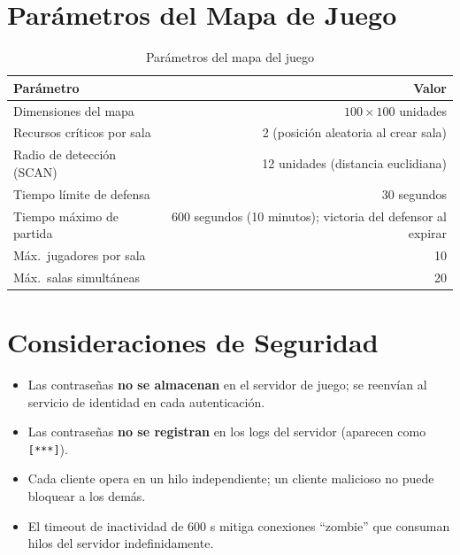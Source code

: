 \documentclass[12pt, letterpaper]{article}
\begin{document}
\section{Parámetros del Mapa de Juego}

\begin{table}[H]
\centering
\begin{tabular}{l r}
\toprule
\textbf{Parámetro} & \textbf{Valor} \\
\midrule
Dimensiones del mapa             & $100 \times 100$ unidades \\
Recursos críticos por sala       & 2 (posición aleatoria al crear sala) \\
Radio de detección (\textsc{SCAN}) & 12 unidades (distancia euclidiana) \\
Tiempo límite de defensa         & 30 segundos \\
Tiempo máximo de partida         & 600 segundos (10 minutos); victoria del defensor al expirar \\
Máx.\ jugadores por sala         & 10 \\
Máx.\ salas simultáneas          & 20 \\
\bottomrule
\end{tabular}
\caption{Parámetros del mapa del juego}
\end{table}

\section{Consideraciones de Seguridad}

\begin{itemize}[leftmargin=2em]
    \item Las contraseñas \textbf{no se almacenan} en el servidor de juego; se reenvían al
          servicio de identidad en cada autenticación.
    \item Las contraseñas \textbf{no se registran} en los logs del servidor (aparecen como
          \texttt{[***]}).
    \item Cada cliente opera en un hilo independiente; un cliente malicioso no puede
          bloquear a los demás.
        \item El timeout de inactividad de 600 s mitiga conexiones ``zombie'' que
          consuman hilos del servidor indefinidamente.
\end{itemize}
\end{document}
